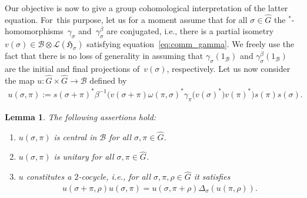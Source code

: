 \documentclass[pdftex]{sigma}
\numberwithin{equation}{section}
\newtheorem{Lemma}[Theorem]{Lemma}
\newcommand*{\tensor}{\otimes}		%
\newcommand*{\Star}{$^*$\nobreakdash}
\newcommand*{\hilb}{\mathfrak}		%
\newcommand*{\alg}{\mathcal}		%
\newcommand*{\hH}{\hilb{H}}			%
\newcommand*{\one}{1}				%
\newcommand*{\aB}{\alg{B}} 			%
\newcommand*{\End}{\mathcal{L}} %
\begin{document}
Our objective is now to give a group cohomological interpretation of the latter equation.
For~this purpose, let us for a moment assume that for all $\sigma \in \hat G$ the \Star-homomorphisms~$\gamma_\sigma$ and~$\gamma_\sigma^\beta$ are conjugated, i.e., there is a partial isometry $v(\sigma) \in \aB \tensor \End(\hH_\sigma)$ satisfying equation~\eqref{eq:comm_gamma}.
We freely use the fact that there is no loss of generality in assuming that $\gamma_\sigma(\one_\aB)$ and $\gamma_\sigma^\beta(\one_\aB)$ are the initial and final projections of~$v(\sigma)$, respectively.
Let us now consider the map $u\colon \hat G \times \hat G \to \aB$ defined by
\begin{gather}\label{eq:unitary_central_element}
	u(\sigma, \pi)
	:=
	s(\sigma + \pi)^* \beta^{-1}\big( v(\sigma + \pi) \omega(\pi,\sigma)^* \gamma_\pi\big(v(\sigma)^*\big) v(\pi)^*\big) s(\pi) s(\sigma).
\end{gather}

\begin{Lemma}\label{lem:unitary_central_cocycle}
	The following assertions hold:
	\begin{enumerate}\itemsep=0pt
	\item[$1.$]
		$u(\sigma, \pi)$ is central in $\aB$ for all $\sigma, \pi \in \hat G$.
	\item[$2.$]
		$u(\sigma, \pi)$ is unitary for all $\sigma, \pi \in \hat G$.
	\item[$3.$]
		$u$ constitutes a $2$-cocycle, i.e., for all $\sigma, \pi, \rho \in \hat G$ it satisfies
		\begin{gather*}%
			u(\sigma + \pi, \rho) u(\sigma, \pi)
			= u(\sigma, \pi + \rho) \Delta_\sigma ( u(\pi, \rho) ).
		\end{gather*}
	\end{enumerate}
\end{Lemma}
\end{document}
